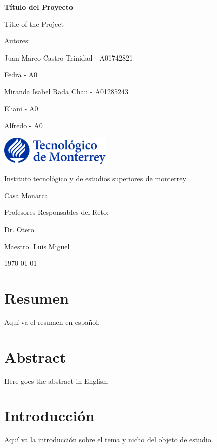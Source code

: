 \documentclass[a4paper,12pt]{report}
\begin{document}
\begin{titlepage}
    \centering
    {\Huge \bfseries Título del Proyecto \par}
    {\Large Title of the Project \par}
    \vspace{1cm}
    {\Large Autores: \par}
    \vspace{0.5cm}
    {\large Juan Marco Castro Trinidad - A01742821 \par}
    {\large Fedra - A0 \par}
    {\large Miranda Isabel Rada Chau - A01285243 \par}
    {\large Eliani - A0 \par}
    {\large Alfredo - A0 \par}
    \vfill
    \includegraphics[width=0.4\textwidth]{logo_tec.png} \par
    \vspace{0.5cm}
    {\Large Instituto tecnológico y de estudios superiores de monterrey  \par}
    {\Large Casa Monarca \par}
    \vfill
    {\Large Profesores Responsables del Reto: \par}
    {\large Dr. Otero \par}
    {\large Maestro. Luis Miguel \par}
    \vfill
    {\large \today \par}
\end{titlepage}

\tableofcontents
\newpage

\chapter*{Resumen}
Aquí va el resumen en español.

\chapter*{Abstract}
Here goes the abstract in English.

\chapter{Introducción}
Aquí va la introducción sobre el tema y nicho del objeto de estudio.
\end{document}
